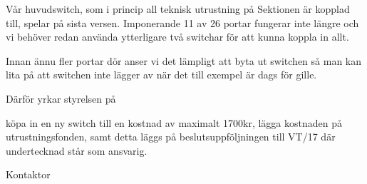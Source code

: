 \documentclass[../_main/handlingar.tex]{subfiles}
\begin{document}

Vår huvudswitch, som i princip all teknisk utrustning på Sektionen är kopplad till, spelar på sista versen. Imponerande 11 av 26 portar fungerar inte längre och vi behöver redan använda ytterligare två switchar för att kunna koppla in allt.

Innan ännu fler portar dör anser vi det lämpligt att byta ut switchen så man kan lita på att switchen inte lägger av när det till exempel är dags för gille.

Därför yrkar styrelsen på
\begin{attsatser}
    \att köpa in en ny switch till en kostnad av maximalt 1700kr,
    \att lägga kostnaden på utrustningsfonden, samt
    \att detta läggs på beslutsuppföljningen till VT/17 där undertecknad står som ansvarig.
\end{attsatser}

\begin{signatures}{1}
    \ist
    \signature{Erik Månsson}{Kontaktor}
\end{signatures}
\end{document}
